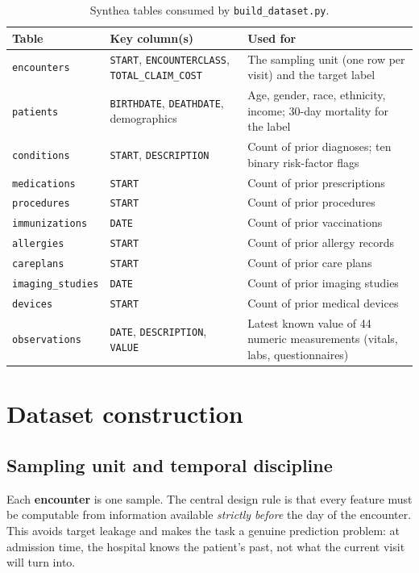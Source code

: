 \documentclass[11pt,a4paper]{article}
\newcommand{\code}[1]{\texttt{\textcolor{codegrey}{#1}}}
\newcommand{\sect}[1]{\section{#1}}
\begin{document}
\begin{table}[H]
\centering\small
\caption{Synthea tables consumed by \code{build\_dataset.py}.}
\label{tab:tables}
\begin{tabular}{@{}lp{4.1cm}p{7.6cm}@{}}
\toprule
\textbf{Table} & \textbf{Key column(s)} & \textbf{Used for} \\
\midrule
\code{encounters}      & \code{START}, \code{ENCOUNTERCLASS}, \code{TOTAL\_CLAIM\_COST} & The sampling unit (one row per visit) and the target label \\
\code{patients}        & \code{BIRTHDATE}, \code{DEATHDATE}, demographics & Age, gender, race, ethnicity, income; 30-day mortality for the label \\
\code{conditions}      & \code{START}, \code{DESCRIPTION} & Count of prior diagnoses; ten binary risk-factor flags \\
\code{medications}     & \code{START} & Count of prior prescriptions \\
\code{procedures}      & \code{START} & Count of prior procedures \\
\code{immunizations}   & \code{DATE}  & Count of prior vaccinations \\
\code{allergies}       & \code{START} & Count of prior allergy records \\
\code{careplans}       & \code{START} & Count of prior care plans \\
\code{imaging\_studies} & \code{DATE} & Count of prior imaging studies \\
\code{devices}         & \code{START} & Count of prior medical devices \\
\code{observations}    & \code{DATE}, \code{DESCRIPTION}, \code{VALUE} & Latest known value of 44 numeric measurements (vitals, labs, questionnaires) \\
\bottomrule
\end{tabular}
\end{table}

\sect{Dataset construction}

\subsection{Sampling unit and temporal discipline}

Each \textbf{encounter} is one sample. The central design rule is that every feature must be
computable from information available \emph{strictly before} the day of the encounter. This avoids
target leakage and makes the task a genuine prediction problem: at admission time, the hospital
knows the patient's past, not what the current visit will turn into.
\end{document}
